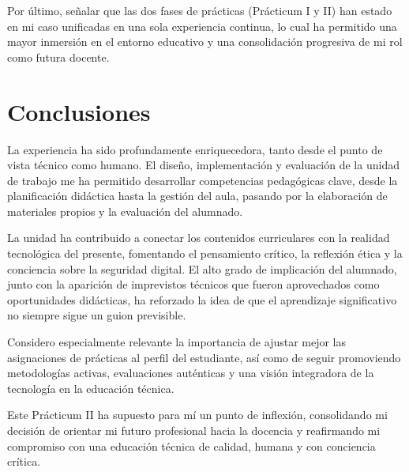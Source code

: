 Por último, señalar que las dos fases de prácticas (Prácticum I y II) han estado en mi caso unificadas en una sola experiencia continua, lo cual ha permitido una mayor inmersión en el entorno educativo y una consolidación progresiva de mi rol como futura docente.


\section{Conclusiones}

La experiencia ha sido profundamente enriquecedora, tanto desde el punto de vista técnico como humano. El diseño, implementación y evaluación de la unidad de trabajo me ha permitido desarrollar competencias pedagógicas clave, desde la planificación didáctica hasta la gestión del aula, pasando por la elaboración de materiales propios y la evaluación del alumnado.

La unidad ha contribuido a conectar los contenidos curriculares con la realidad tecnológica del presente, fomentando el pensamiento crítico, la reflexión ética y la conciencia sobre la seguridad digital. El alto grado de implicación del alumnado, junto con la aparición de imprevistos técnicos que fueron aprovechados como oportunidades didácticas, ha reforzado la idea de que el aprendizaje significativo no siempre sigue un guion previsible.

Considero especialmente relevante la importancia de ajustar mejor las asignaciones de prácticas al perfil del estudiante, así como de seguir promoviendo metodologías activas, evaluaciones auténticas y una visión integradora de la tecnología en la educación técnica.

Este Prácticum II ha supuesto para mí un punto de inflexión, consolidando mi decisión de orientar mi futuro profesional hacia la docencia y reafirmando mi compromiso con una educación técnica de calidad, humana y con conciencia crítica.

